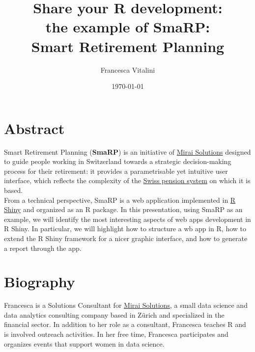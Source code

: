 \documentclass[]{article}
\title{Share your R development:\\
	the example of SmaRP:\\
	Smart Retirement Planning}
\author{Francesca Vitalini}
\date{\today}
\begin{document}
\maketitle

\section*{\normalsize{Abstract}}
Smart Retirement Planning (\textbf{SmaRP}) is an initiative of \href{https://mirai-solutions.ch/}{Mirai Solutions} designed to guide people working in Switzerland towards a strategic decision-making process for their retirement: it provides a parametrisable yet intuitive user interface, which reflects the complexity of the \href{ttps://en.wikipedia.org/wiki/Pension_system_in_Switzerland}{Swiss pension system} on which it is based.\\

From a technical perspective, SmaRP is a web application implemented in \href{https://shiny.rstudio.com/}{R Shiny} and organized as an R package. 
In this presentation, using SmaRP as an example, we will identify the most interesting aspects of web apps development in R Shiny. In particular, we will highlight how to structure a wb app in R, how to extend the R Shiny framework for a nicer graphic interface, and how to generate a report through the app.

\section*{\normalsize{Biography}}
Francesca is a Solutions Consultant for \href{https://mirai-solutions.ch/}{Mirai Solutions}, a small data science and data analytics consulting company based in Z\"{u}rich and specialized in the financial sector. In addition to her role as a consultant, Francesca teaches R and is involved outreach activities. In her free time, Francesca participates and organizes events that support women in data science.
\end{document}
